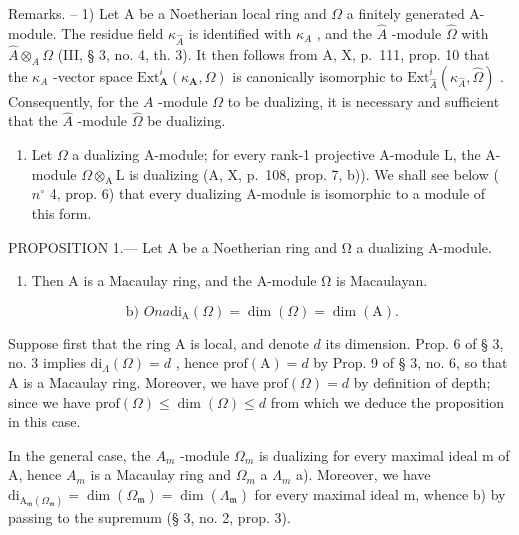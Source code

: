 Remarks. -- 1) Let A be a Noetherian local ring and \(\Omega\) a finitely generated A-module. The residue field \(\kappa_{\widehat{A}}\) is identified with \(\kappa_{A}\) , and the \(\widehat{A}\) -module \(\widehat{\Omega}\) with \(\widehat{A} \otimes_{A} \Omega\) (III, § 3, no. 4, th. 3). It then follows from A, X, p.~111, prop. 10 that the \(\kappa_{A}\) -vector space \(\mathrm{Ext}_{\mathbf{A}}^{i}(\kappa_{\mathbf{A}}, \Omega)\) is canonically isomorphic to \(\mathrm{Ext}_{\widehat{A}}^{i}(\kappa_{\widehat{A}}, \widehat{\Omega})\) . Consequently, for the \(A\) -module \(\Omega\) to be dualizing, it is necessary and sufficient that the \(\widehat{A}\) -module \(\widehat{\Omega}\) be dualizing.

\begin{enumerate}
\def\labelenumi{\arabic{enumi})}
\setcounter{enumi}{1}
\tightlist
\item
  Let \(\Omega\) a dualizing A-module; for every rank-1 projective A-module L, the A-module \(\Omega\otimes_{\mathrm{A}}\mathrm{L}\) is dualizing (A, X, p.~108, prop. 7, b)). We shall see below ( \(n^{\circ}\) 4, prop. 6) that every dualizing A-module is isomorphic to a module of this form.
\end{enumerate}

PROPOSITION 1.--- Let A be a Noetherian ring and Ω a dualizing A-module.

\begin{enumerate}
\def\labelenumi{\alph{enumi})}
\tightlist
\item
  Then A is a Macaulay ring, and the A-module Ω is Macaulayan.
\end{enumerate}

\[
\text { b) } O n a \mathrm{di} _ {\mathrm{A}} (\Omega) = \dim (\Omega) = \dim (\mathrm{A}).
\]

Suppose first that the ring A is local, and denote \(d\) its dimension. Prop. 6 of § 3, no. 3 implies \(\mathrm{di}_{\Lambda}(\Omega) = d\) , hence \(\mathrm{prof}(\mathrm{A}) = d\) by Prop. 9 of § 3, no. 6, so that A is a Macaulay ring. Moreover, we have \(\mathrm{prof}(\Omega) = d\) by definition of depth; since we have \(\mathrm{prof}(\Omega) \leqslant \dim(\Omega) \leqslant d\) from which we deduce the proposition in this case.

In the general case, the \(A_{m}\) -module \(\Omega_{m}\) is dualizing for every maximal ideal m of A, hence \(A_{m}\) is a Macaulay ring and \(\Omega_{m}\) a \(\Lambda_{m}\) a). Moreover, we have \(\mathrm{di}_{\mathrm{A}_{\mathfrak{m}}(\Omega_{\mathfrak{m}})} = \dim(\Omega_{\mathfrak{m}}) = \dim(\Lambda_{\mathfrak{m}})\) for every maximal ideal m, whence b) by passing to the supremum (§ 3, no. 2, prop. 3).

